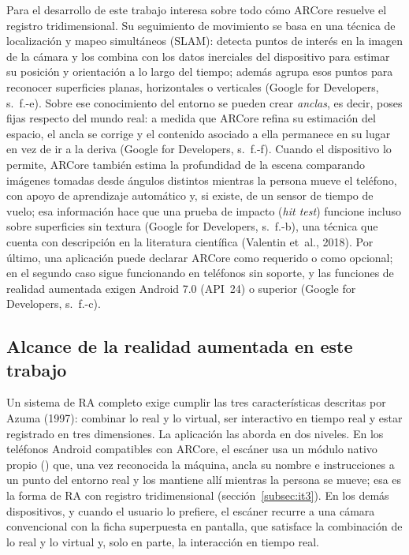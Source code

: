 Para el desarrollo de este trabajo interesa sobre todo cómo ARCore resuelve el
registro tridimensional. Su seguimiento de movimiento se basa en una técnica de
localización y mapeo simultáneos (SLAM): detecta puntos de interés en la imagen
de la cámara y los combina con los datos inerciales del dispositivo para
estimar su posición y orientación a lo largo del tiempo; además agrupa esos
puntos para reconocer superficies planas, horizontales o verticales (Google for
Developers, s.~f.-e). Sobre ese conocimiento del entorno se pueden crear
\emph{anclas}, es decir, poses fijas respecto del mundo real: a medida que
ARCore refina su estimación del espacio, el ancla se corrige y el contenido
asociado a ella permanece en su lugar en vez de ir a la deriva (Google for
Developers, s.~f.-f). Cuando el dispositivo lo permite, ARCore también estima
la profundidad de la escena comparando imágenes tomadas desde ángulos distintos
mientras la persona mueve el teléfono, con apoyo de aprendizaje automático y,
si existe, de un sensor de tiempo de vuelo; esa información hace que una prueba
de impacto (\emph{hit test}) funcione incluso sobre superficies sin textura
(Google for Developers, s.~f.-b), una técnica que cuenta con descripción en la
literatura científica (Valentin et~al., 2018). Por último, una aplicación puede
declarar ARCore como requerido o como opcional; en el segundo caso sigue
funcionando en teléfonos sin soporte, y las funciones de realidad aumentada
exigen Android 7.0 (API~24) o superior (Google for Developers, s.~f.-c).

\subsection{Alcance de la realidad aumentada en este trabajo}
\label{subsec:ra-alcance}

Un sistema de RA completo exige cumplir las tres características descritas por
Azuma (1997): combinar lo real y lo virtual, ser interactivo en tiempo real y
estar registrado en tres dimensiones. La aplicación las aborda en dos niveles.
En los teléfonos Android compatibles con ARCore, el escáner usa un módulo
nativo propio () que, una vez reconocida la máquina, ancla su
nombre e instrucciones a un punto del entorno real y los mantiene allí mientras
la persona se mueve; esa es la forma de RA con registro tridimensional
(sección~\ref{subsec:it3}). En los demás dispositivos, y cuando el usuario lo
prefiere, el escáner recurre a una cámara convencional con la ficha
superpuesta en pantalla, que satisface la combinación de lo real y lo virtual
y, solo en parte, la interacción en tiempo real.

